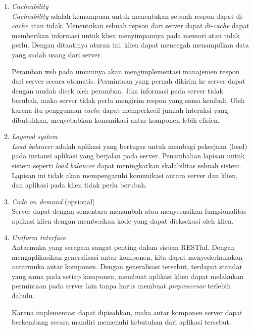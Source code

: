 \begin{enumerate}
        \item \textit{Cacheability}\\
            \textit{Cacheability} adalah kemampuan untuk menentukan sebuah respon dapat di-\textit{cache} atau tidak. Menentukan sebuah repson dari server dapat di-\textit{cache} dapat memberikan informasi untuk klien menyimpannya pada memori atau tidak perlu. Dengan ditaatinya aturan ini, klien dapat mencegah menampilkan data yang sudah usang dari server.
            
            Peramban web pada umumnya akan mengimplementasi manajemen respon dari server secara otomatis. Permintaan yang pernah dikirim ke server dapat dengan mudah dicek oleh peramban. Jika informasi pada server tidak berubah, maka server tidak perlu mengirim respon yang sama kembali. Oleh karena itu penggunaan \textit{cache} dapat memperkecil jumlah interaksi yang dibutuhkan, menyebabkan komunikasi antar komponen lebih efisien.
            
        \item \textit{Layered system}\\
            \textit{Load balancer} adalah aplikasi yang bertugas untuk membagi pekerjaan (load) pada instansi aplikasi yang berjalan pada server.
            Penambahan lapisan untuk sistem seperti \textit{load balancer} dapat meningkatkan skalabilitas sebuah sistem. Lapisan ini tidak akan mempengaruhi komunikasi antara server dan klien, dan aplikasi pada klien tidak perlu berubah.
        
        \item \textit{Code on demand} (opsional)\\
            Server dapat dengan sementara menambah atau menyesuaikan fungsionalitas aplikasi klien dengan memberikan kode yang dapat dieksekusi oleh klien.
        
        \item \textit{Uniform interface}\\
            Antarmuka yang seragam sangat penting dalam sistem RESTful. Dengan mengaplikasikan generalisasi antar komponen, kita dapat menyederhanakan antarmuka antar komponen. Dengan generalisasi tersebut, terdapat standar yang sama pada setiap komponen, membuat aplikasi klien dapat melakukan permintaan pada server lain tanpa harus membuat \textit{preproccesor} terlebih dahulu.
            
            Karena implementasi dapat dipisahkan, maka antar komponen server dapat berkembang secara mandiri memenuhi kebutuhan dari aplikasi tersebut.
            
    \end{enumerate}

